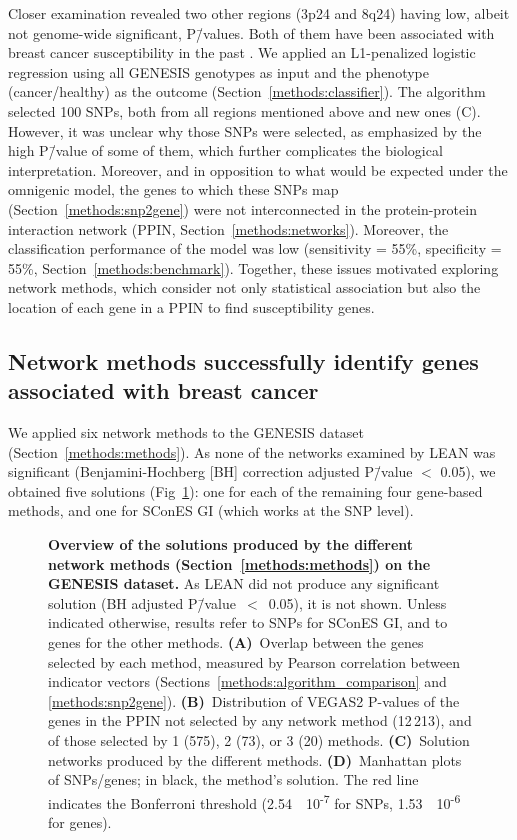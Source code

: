 \documentclass[10pt,letterpaper]{article}
\begin{document}
Closer examination revealed two other regions (3p24 and 8q24) having low, albeit not genome-wide significant, P\=/values. Both of them have been associated with breast cancer susceptibility in the past \cite{brisbin_meta-analysis_2011,search_newly_2009}. We applied an L1-penalized logistic regression using all GENESIS genotypes as input and the phenotype (cancer/healthy) as the outcome (Section~\ref{methods:classifier}). The algorithm selected 100 SNPs, both from all regions mentioned above and new ones (C). However, it was unclear why those SNPs were selected, as emphasized by the high P\=/value of some of them, which further complicates the biological interpretation. Moreover, and in opposition to what would be expected under the omnigenic model, the genes to which these SNPs map (Section~\ref{methods:snp2gene}) were not interconnected in the protein-protein interaction network (PPIN, Section~\ref{methods:networks}). Moreover, the classification performance of the model was low (sensitivity = 55\%, specificity = 55\%, Section~\ref{methods:benchmark}). Together, these issues motivated exploring network methods, which consider not only statistical association but also the location of each gene in a PPIN to find susceptibility genes.

\subsection{Network methods successfully identify genes associated with breast cancer}
\label{results:separate_networks}

We applied six network methods to the GENESIS dataset (Section~\ref{methods:methods}). As none of the networks examined by LEAN was significant (Benjamini-Hochberg [BH] correction adjusted P\=/value $<$ 0.05), we obtained five solutions (Fig~\ref{fig:solution_overview}): one for each of the remaining four gene-based methods, and one for SConES GI (which works at the SNP level).

\begin{figure}[!ht]
  \centering
  \caption{\textbf{Overview of the solutions produced by the different network methods (Section~\ref{methods:methods}) on the GENESIS dataset.} As LEAN did not produce any significant solution (BH adjusted P\=/value~$<$~0.05), it is not shown. Unless indicated otherwise, results refer to SNPs for SConES GI, and to genes for the other methods. \textbf{(A)}~Overlap between the genes selected by each method, measured by Pearson correlation between indicator vectors (Sections~\ref{methods:algorithm_comparison} and \ref{methods:snp2gene}). \textbf{(B)}~Distribution of VEGAS2 P-values of the genes in the PPIN not selected by any network method (12\,213), and of those selected by 1 (575), 2 (73), or 3 (20) methods. \textbf{(C)}~Solution networks produced by the different methods. \textbf{(D)}~Manhattan plots of SNPs/genes; in black, the method's solution. The red line indicates the Bonferroni threshold (2.54~\texttimes{}~10\textsuperscript{-7} for SNPs, 1.53~\texttimes{}~10\textsuperscript{-6} for genes).}
  \label{fig:solution_overview}
\end{figure}
\end{document}

